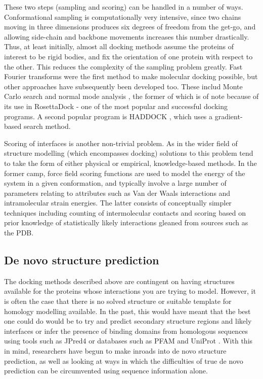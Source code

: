 \documentclass[a4paper,11pt,twoside,openright]{scrbook}
\begin{document}
These two steps (sampling and scoring) can be handled in a number of ways. Conformational sampling is computationally very intensive, since two chains moving in three dimensions produces six degrees of freedom from the get-go, and allowing side-chain and backbone movements increases this number drastically. Thus, at least initially, almost all docking methods assume the proteins of interest to be rigid bodies, and fix the orientation of one protein with respect to the other. This reduces the complexity of the sampling problem greatly. Fast Fourier transforms \cite{Katchalski-Katzir1992} were the first method to make molecular docking possible, but other approaches have subsequently been developed too. These includ Monte Carlo search \cite{Hart1992} and normal mode analysis \cite{Zacharias2005}, the former of which is of note because of its use in RosettaDock \cite{Lyskov2008,Zhang2015} - one of the most popular and successful docking programs. A second popular program is HADDOCK \cite{Dominguez2003,VanZundert2016}, which uses a gradient-based search method.

Scoring of interfaces is another non-trivial problem. As in the wider field of structure modelling (which encompasses docking) solutions to this problem tend to take the form of either physical or empirical, knowledge-based methods. In the former camp, force field scoring functions \cite{Kynast2016} are used to model the energy of the system in a given conformation, and typically involve a large number of parameters relating to attributes such as Van der Waals interactions and intramolecular strain energies. The latter consists of conceptually simpler techniques including counting of intermolecular contacts \cite{Bohm1998} and scoring based on prior knowledge of statistically likely interactions \cite{Sasse2017} gleaned from sources such as the PDB.

\subsection{De novo structure prediction}
The docking methods described above are contingent on having structures available for the proteins whose interactions you are trying to model. However, it is often the case that there is no solved structure or suitable template for homology modelling available. In the past, this would have meant that the best one could do would be to try and predict secondary structure regions and likely interfaces or infer the presence of binding domains from homologous sequences using tools such as JPred4 \cite{Drozdetskiy2015} or databases such as PFAM and UniProt \cite{Finn2016,Consortium2017}. With this in mind, researchers have begun to make inroads into de novo structure prediction, as well as looking at ways in which the difficulties of true de novo prediction can be circumvented using sequence information alone.
\end{document}
